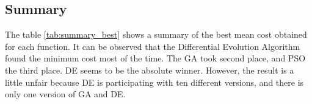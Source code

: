 \documentclass[12pt]{article}
\begin{document}
    \subsection{Summary}
    

The table \ref{tab:summary_best} shows a summary of the best mean cost obtained for each function. It can be observed that the Differential Evolution Algorithm found the minimum cost most of the time. The GA took second place,  and PSO the third place. DE seems to be the absolute winner. However, the result is a little unfair because DE is participating with ten different versions, and there is only one version of GA and DE.




\end{document}
